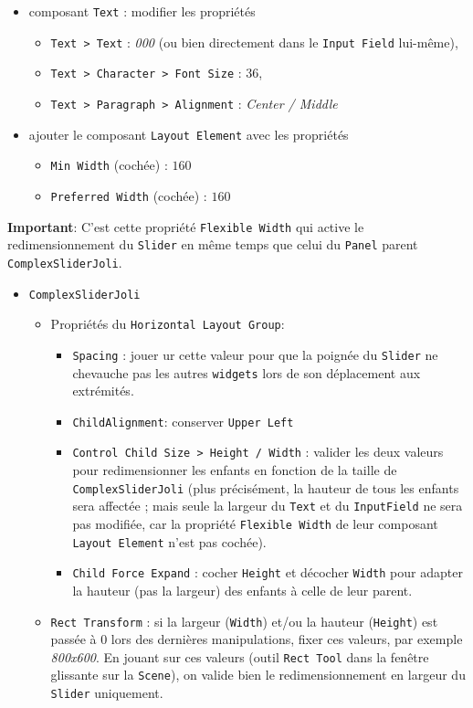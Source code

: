 \documentclass[a4paper,10pt]{article}
\newenvironment{solution}%
{\begin{tcolorbox}[breakable,colback=red!5!white,colframe=red!75!black,title=Solution]}%
{\end{tcolorbox}}
\begin{document}
\begin{solution}
\begin{itemize}
\begin{itemize}
		\item composant \texttt{Text} : modifier les propriétés
		\begin{itemize} 	
			\item \texttt{Text > Text} : \textit{000} (ou bien directement dans le \texttt{Input Field} lui-même),
			\item \texttt{Text > Character > Font Size} : $36$,
			\item \texttt{Text > Paragraph > Alignment} : \textit{Center / Middle}
		\end{itemize}		
		\item ajouter le composant \texttt{Layout Element} avec les propriétés
		\begin{itemize} 	
			\item \texttt{Min Width} (cochée) : $160$
			\item \texttt{Preferred Width} (cochée) : $160$
		\end{itemize}		
	\end{itemize}	
\end{itemize}

\textbf{Important}: C'est cette propriété \texttt{Flexible Width} qui active le redimensionnement du \texttt{Slider} en même temps que celui du \texttt{Panel} parent \texttt{ComplexSliderJoli}. 

\begin{itemize} 	
	\item  \texttt{ComplexSliderJoli}
	\begin{itemize} 	
		\item Propriétés du \texttt{Horizontal Layout Group}:
		\begin{itemize} 
			\item \texttt{Spacing} : jouer ur cette valeur pour que la poignée du \texttt{Slider} ne chevauche pas les autres \texttt{widgets} lors de son déplacement aux extrémités.	
			\item \texttt{ChildAlignment}: conserver \texttt{Upper Left}
			\item \texttt{Control Child Size > Height / Width} : valider les deux valeurs pour redimensionner les enfants en fonction de la taille de \texttt{ComplexSliderJoli} (plus précisément, la hauteur de tous les enfants sera affectée ; mais seule la largeur du \texttt{Text} et du \texttt{InputField} ne sera pas modifiée, car la propriété \texttt{Flexible Width} de leur composant \texttt{Layout Element} n'est pas cochée).
			\item \texttt{Child Force Expand} : cocher \texttt{Height} et décocher \texttt{Width} pour adapter la hauteur (pas la largeur) des enfants à celle de leur parent.		
		\end{itemize}	
		\item \texttt{Rect Transform} : si la largeur (\texttt{Width}) et/ou la hauteur (\texttt{Height}) est passée à $0$ lors des dernières manipulations, fixer ces valeurs, par exemple \textit{800x600}. En jouant sur ces valeurs (outil \texttt{Rect Tool} dans la fenêtre glissante sur la \texttt{Scene}), on valide bien le redimensionnement en largeur du \texttt{Slider} uniquement.
	\end{itemize}
\end{itemize}


\end{solution}
\end{document}
